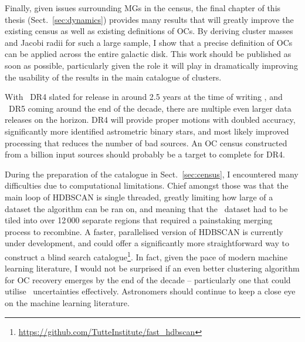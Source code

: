 Finally, given issues surrounding MGs in the census, the final chapter of this thesis (Sect.~\ref{sec:dynamics}) provides many results that will greatly improve the existing census as well as existing definitions of OCs. By deriving cluster masses and Jacobi radii for such a large sample, I show that a precise definition of OCs can be applied across the entire galactic disk. This work should be published as soon as possible, particularly given the role it will play in dramatically improving the usability of the results in the main catalogue of clusters.

With \gaia\ DR4 slated for release in around 2.5 years at the time of writing \citep[no sooner than the end of 2025,][]{gaia_collaboration_gaia_2022}, and \gaia\ DR5 coming around the end of the decade, there are multiple even larger data releases on the horizon. DR4 will provide proper motions with doubled accuracy, significantly more identified astrometric binary stars, and most likely improved processing that reduces the number of bad sources. An OC census constructed from a billion input sources should probably be a target to complete for DR4.

During the preparation of the catalogue in Sect.~\ref{sec:census}, I encountered many difficulties due to computational limitations. Chief amongst those was that the main loop of HDBSCAN is single threaded, greatly limiting how large of a dataset the algorithm can be ran on, and meaning that the \gaia\ dataset had to be tiled into over 12\,000 separate regions that required a painstaking merging process to recombine. A faster, parallelised version of HDBSCAN is currently under development, and could offer a significantly more straightforward way to construct a blind search catalogue\footnote{\url{https://github.com/TutteInstitute/fast_hdbscan}}. In fact, given the pace of modern machine learning literature, I would not be surprised if an even better clustering algorithm for OC recovery emerges by the end of the decade -- particularly one that could utilise \gaia\ uncertainties effectively. Astronomers should continue to keep a close eye on the machine learning literature.


